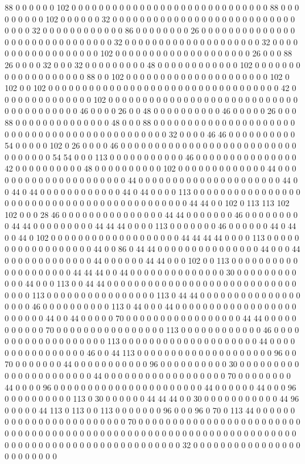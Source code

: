 88 0 0 0 0 0 0 102 0 0 0 0 0 0 0 0 0 0 0 0 0 0 0 0 0 0 0 0 0 0 0 0 0 0 0 0 0 88 0 0 0 0 0 0 0 0 0 102 0 0 0 0 0 0 32 0 0 0 0 0 0 0 0 0 0 0 0 0 0 0 0 0 0 0 0 0 0 0 0 0 0 0 0 0 0 0 32 0 0 0 0 0 0 0 0 0 0 0 0 86 0 0 0 0 0 0 0 0 26 0 0 0 0 0 0 0 0 0 0 0 0 0 0 0 0 0 0 0 0 0 0 0 0 0 0 0 0 0 0 32 0 0 0 0 0 0 0 0 0 0 0 0 0 0 0 0 0 0 0 0 32 0 0 0 0 0 0 0 0 0 0 0 0 0 0 0 0 0 0 102 0 0 0 0 0 0 0 0 0 0 0 0 0 0 0 0 0 0 0 0 26 0 0 0 88 26 0 0 0 0 32 0 0 0 32 0 0 0 0 0 0 0 0 0 48 0 0 0 0 0 0 0 0 0 0 0 0 102 0 0 0 0 0 0 0 0 0 0 0 0 0 0 0 0 0 0 0 88 0 0 102 0 0 0 0 0 0 0 0 0 0 0 0 0 0 0 0 0 0 0 0 0 102 0 102 0 0 102 0 0 0 0 0 0 0 0 0 0 0 0 0 0 0 0 0 0 0 0 0 0 0 0 0 0 0 0 0 0 0 0 0 0 42 0 0 0 0 0 0 0 0 0 0 0 0 0 0 102 0 0 0 0 0 0 0 0 0 0 0 0 0 0 0 0 0 0 0 0 0 0 0 0 0 0 0 0 0 0 0 0 0 0 0 0 0 0 0 46 0 0 0 0 26 0 0 48 0 0 0 0 0 0 0 0 0 0 46 0 0 0 0 0 26 0 0 0 88 0 0 0 0 0 0 0 0 0 0 0 0 0 0 48 0 0 0 88 0 0 0 0 0 0 0 0 0 0 0 0 0 0 0 0 0 0 0 0 0 0 0 0 0 0 0 0 0 0 0 0 0 0 0 0 0 0 0 0 0 0 0 0 0 32 0 0 0 0 46 46 0 0 0 0 0 0 0 0 0 0 54 0 0 0 0 0 102 0 26 0 0 0 0 46 0 0 0 0 0 0 0 0 0 0 0 0 0 0 0 0 0 0 0 0 0 0 0 0 0 0 0 0 0 0 0 0 0 54 54 0 0 0 113 0 0 0 0 0 0 0 0 0 0 0 46 0 0 0 0 0 0 0 0 0 0 0 0 0 0 0 42 0 0 0 0 0 0 0 0 0 0 48 0 0 0 0 0 0 0 0 0 0 102 0 0 0 0 0 0 0 0 0 0 0 0 0 44 0 0 0 0 0 0 0 0 0 0 0 0 0 0 0 0 0 0 0 0 0 44 0 0 0 0 0 0 0 0 0 0 0 0 0 0 0 0 0 0 0 0 0 44 0 0 44 0 44 0 0 0 0 0 0 0 0 0 0 0 0 44 0 44 0 0 0 0 113 0 0 0 0 0 0 0 0 0 0 0 0 0 0 0 0 0 0 0 0 0 0 0 0 0 0 0 0 0 0 0 0 0 0 0 0 0 0 0 0 0 0 0 44 44 0 0 102 0 113 113 102 102 0 0 0 28 46 0 0 0 0 0 0 0 0 0 0 0 0 0 0 0 44 44 0 0 0 0 0 0 0 46 0 0 0 0 0 0 0 0 0 44 44 0 0 0 0 0 0 0 0 0 44 44 44 0 0 0 0 113 0 0 0 0 0 0 0 46 0 0 0 0 0 0 44 0 44 0 0 44 0 102 0 0 0 0 0 0 0 0 0 0 0 0 0 0 0 0 0 0 0 44 44 44 44 0 0 0 0 113 0 0 0 0 0 0 0 0 0 0 0 0 0 0 0 0 0 0 44 0 0 86 0 44 44 0 0 0 0 0 0 0 0 0 0 0 0 0 0 0 44 0 0 0 44 0 0 0 0 0 0 0 0 0 0 0 0 0 44 0 0 0 0 0 0 44 44 0 0 0 102 0 0 113 0 0 0 0 0 0 0 0 0 0 0 0 0 0 0 0 0 0 0 0 44 44 44 0 0 44 0 0 0 0 0 0 0 0 0 0 0 0 0 0 30 0 0 0 0 0 0 0 0 0 0 0 0 44 0 0 0 113 0 0 44 44 0 0 0 0 0 0 0 0 0 0 0 0 0 0 0 0 0 0 0 0 0 0 0 0 0 0 0 0 0 0 0 0 113 0 0 0 0 0 0 0 0 0 0 0 0 0 0 0 0 113 0 44 44 0 0 0 0 0 0 0 0 0 0 0 0 0 0 0 0 0 0 0 46 0 0 0 0 0 0 0 0 0 0 113 0 44 0 0 0 44 0 0 0 0 0 0 0 0 0 0 0 0 0 0 0 0 0 0 0 0 0 0 0 0 44 0 0 44 0 0 0 0 0 70 0 0 0 0 0 0 0 0 0 0 0 0 0 0 0 0 0 44 44 0 0 0 0 0 0 0 0 0 0 0 70 0 0 0 0 0 0 0 0 0 0 0 0 0 0 0 0 113 0 0 0 0 0 0 0 0 0 0 0 0 46 0 0 0 0 0 0 0 0 0 0 0 0 0 0 0 0 0 0 0 113 0 0 0 0 0 0 0 0 0 0 0 0 0 0 0 0 0 0 0 0 44 0 0 0 0 0 0 0 0 0 0 0 0 0 0 0 0 46 0 0 44 113 0 0 0 0 0 0 0 0 0 0 0 0 0 0 0 0 0 0 0 0 96 0 0 70 0 0 0 0 0 0 0 44 0 0 0 0 0 0 0 0 0 0 0 96 0 0 0 0 0 0 0 0 0 0 30 0 0 0 0 0 0 0 0 0 0 0 0 0 0 0 0 0 0 0 0 0 0 44 0 0 0 0 0 0 0 0 0 0 0 0 0 0 0 0 0 0 70 0 0 0 0 0 0 0 0 44 0 0 0 0 96 0 0 0 0 0 0 0 0 0 0 0 0 0 0 0 0 0 0 0 0 0 0 44 0 0 0 0 0 0 44 0 0 0 96 0 0 0 0 0 0 0 0 0 0 113 0 30 0 0 0 0 0 0 44 44 44 0 0 30 0 0 0 0 0 0 0 0 0 0 0 44 96 0 0 0 0 0 44 113 0 113 0 0 113 0 0 0 0 0 0 0 96 0 0 0 96 0 70 0 113 44 0 0 0 0 0 0 0 0 0 0 0 0 0 0 0 0 0 0 0 0 0 0 0 0 70 0 0 0 0 0 0 0 0 0 0 0 0 0 0 0 0 0 0 0 0 0 0 0 0 0 0 0 0 0 0 0 0 0 0 0 0 0 0 0 0 0 0 0 0 0 0 0 0 0 0 0 0 0 0 0 0 0 0 0 0 0 0 0 0 0 0 0 0 0 0 0 0 0 0 0 0 0 0 0 0 0 0 0 0 0 0 0 0 0 0 0 0 0 32 0 0 0 0 0 0 0 0 0 0 0 0 0 0 0 0 0 0 0 0 0 0 0 0 